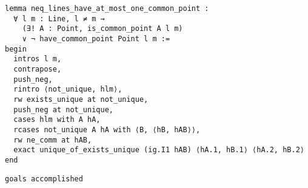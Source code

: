 \begin{frame}[fragile]
	\begin{multicols}{2}
		\begin{lstlisting}
lemma neq_lines_have_at_most_one_common_point :
  ∀ l m : Line, l ≠ m → 
    (∃! A : Point, is_common_point A l m) 
    ∨ ¬ have_common_point Point l m := 
begin
  intros l m,
  contrapose,
  push_neg,
  rintro ⟨not_unique, hlm⟩,
  rw exists_unique at not_unique,
  push_neg at not_unique,
  cases hlm with A hA,
  rcases not_unique A hA with ⟨B, ⟨hB, hAB⟩⟩,
  rw ne_comm at hAB,
  exact unique_of_exists_unique (ig.I1 hAB) ⟨hA.1, hB.1⟩ ⟨hA.2, hB.2⟩
end
\end{lstlisting}
		\columnbreak
		\lstinline{goals accomplished} \checkmark
	\end{multicols}
\end{frame}







































